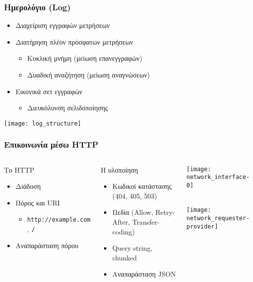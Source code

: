 \documentclass[xetex,mathserif,serif]{beamer}
\begin{document}
\begin{frame}
    \frametitle{Ημερολόγιο (Log)}
    \begin{itemize}
    \item Διαχείριση εγγραφών μετρήσεων
    \item Διατήρηση πλέον πρόσφατων μετρήσεων
        \begin{itemize}
        \item Κυκλική μνήμη (μείωση επανεγγραφών)
        \item Δυαδική αναζήτηση (μείωση αναγνώσεων)
        \end{itemize}
    \item Εικονικά σετ εγγραφών
        \begin{itemize}
            \item Διευκόλυνση σελιδοποίησης
        \end{itemize}
    \end{itemize}
    \begin{center}
        \texttt{[image: log\_structure]}
    \end{center}
\end{frame}


\begin{frame}\frametitle
    {Επικοινωνία μέσω HTTP}

    \begin{columns}
    \column{5.5cm}

    \begin{block}{Το HTTP}
        \begin{itemize}
        \item Διάδοση
        \item Πόρος και URI
            \begin{itemize}
            \item \verb~http://example.com~ , \verb~/~
            \end{itemize}
        \item Αναπαράσταση πόρου
        \end{itemize}
    \end{block}

    \begin{block}{Η υλοποίηση}
        \begin{itemize}
        \item Κωδικοί κατάστασης {\tiny (404, 405, 503)}
        \item Πεδία {\tiny (Allow, Retry-After, Transfer-coding)}
        \item Query string, chunked
        \item Αναπαράσταση JSON
        \end{itemize}
    \end{block}

    \column{5.5cm}
    \begin{center}
    \texttt{[image: network\_interface-0]}\\
    \rule{0pt}{1cm}\\
    \texttt{[image: network\_requester-provider]}
    \end{center}
    \end{columns}
\end{frame}
\end{document}
